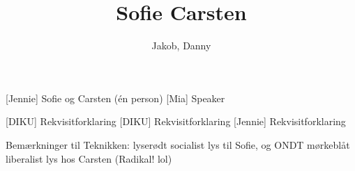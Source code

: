 \documentclass[a4paper,11pt]{article}
\title{Sofie Carsten}
\author{Jakob, Danny}
\begin{document}
\maketitle

\begin{roles}
    [Jennie] Sofie og Carsten (én person)
    [Mia] Speaker
\end{roles}

\begin{props}
    [DIKU] Rekvisitforklaring
    [DIKU] Rekvisitforklaring
    [Jennie] Rekvisitforklaring
\end{props}

\scene 
Bemærkninger til Teknikken:
lyserødt socialist lys til Sofie, og ONDT mørkeblåt liberalist lys hos Carsten (Radikal! lol)
\end{document}
